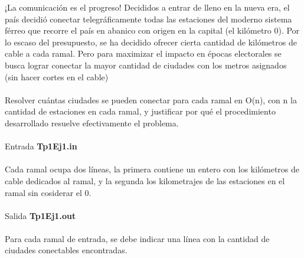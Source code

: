 ¡La comunicaci\'on es el progreso! Decididos a entrar de lleno en la nueva era, el pa\'is decidi\'o conectar
telegr\'aficamente todas las estaciones del moderno sistema f\'erreo que recorre el pa\'is en abanico con origen
en la capital (el kil\'ometro 0). Por lo escaso del presupuesto, se ha decidido ofrecer cierta cantidad de
kil\'ometros de cable a cada ramal. Pero para maximizar el impacto en \'epocas electorales se busca lograr
conectar la mayor cantidad de ciudades con los metros asignados (sin hacer cortes en el cable)\\\\
Resolver cu\'antas ciudades se pueden conectar para cada ramal en O(n), con n la cantidad de estaciones
en cada ramal, y justificar por qu\'e el procedimiento desarrollado resuelve efectivamente el problema.\\\\
Entrada \textbf{Tp1Ej1.in}\\\\
Cada ramal ocupa dos l\'ineas, la primera contiene un entero con los kil\'ometros de cable dedicados al
ramal, y la segunda los kilometrajes de las estaciones en el ramal sin cosiderar el 0.\\\\
Salida \textbf{Tp1Ej1.out}\\\\
Para cada ramal de entrada, se debe indicar una l\'inea con la cantidad de ciudades conectables encontradas.\\